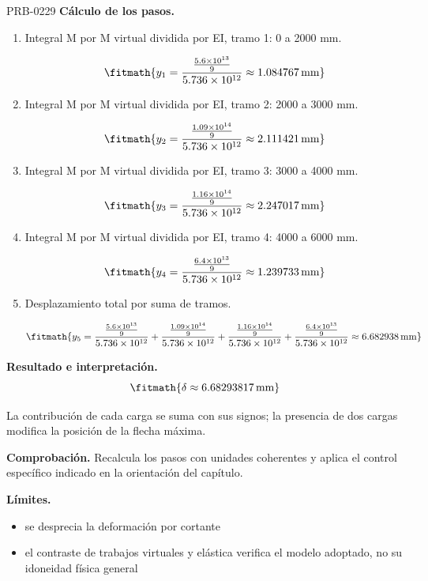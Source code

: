 \begin{studiumworked}{PRB-0229}
\textbf{Cálculo de los pasos.}

\begin{enumerate}

\item Integral M por M virtual dividida por EI, tramo 1: 0 a 2000 mm.

\[\fitmath{y_{1}=\frac{\frac{5.6\times10^{13}}{9}}{5.736\times10^{12}}\approx 1.084767\,\mathrm{mm}}\]

\item Integral M por M virtual dividida por EI, tramo 2: 2000 a 3000 mm.

\[\fitmath{y_{2}=\frac{\frac{1.09\times10^{14}}{9}}{5.736\times10^{12}}\approx 2.111421\,\mathrm{mm}}\]

\item Integral M por M virtual dividida por EI, tramo 3: 3000 a 4000 mm.

\[\fitmath{y_{3}=\frac{\frac{1.16\times10^{14}}{9}}{5.736\times10^{12}}\approx 2.247017\,\mathrm{mm}}\]

\item Integral M por M virtual dividida por EI, tramo 4: 4000 a 6000 mm.

\[\fitmath{y_{4}=\frac{\frac{6.4\times10^{13}}{9}}{5.736\times10^{12}}\approx 1.239733\,\mathrm{mm}}\]

\item Desplazamiento total por suma de tramos.

\[\fitmath{y_{5}=\frac{\frac{5.6\times10^{13}}{9}}{5.736\times10^{12}}+\frac{\frac{1.09\times10^{14}}{9}}{5.736\times10^{12}}+\frac{\frac{1.16\times10^{14}}{9}}{5.736\times10^{12}}+\frac{\frac{6.4\times10^{13}}{9}}{5.736\times10^{12}}\approx 6.682938\,\mathrm{mm}}\]

\end{enumerate}

\textbf{Resultado e interpretación.}\[\fitmath{\delta \approx 6.68293817\,\mathrm{mm}}\]

La contribución de cada carga se suma con sus signos; la presencia de dos cargas modifica la posición de la flecha máxima.

\par\textbf{Comprobación.} Recalcula los pasos con unidades coherentes y aplica el control específico indicado en la orientación del capítulo.

\textbf{Límites.}\begin{itemize}\item se desprecia la deformación por cortante
\item el contraste de trabajos virtuales y elástica verifica el modelo adoptado, no su idoneidad física general\end{itemize}


\end{studiumworked}
